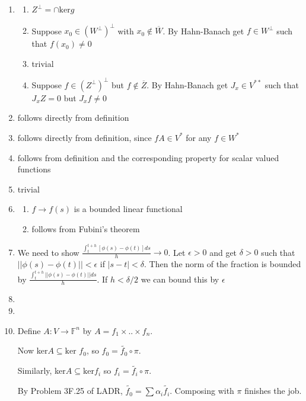 \documentclass{article}
\begin{document}
\begin{enumerate}
\begin{enumerate}
\begin{itemize}
            
            
            
        \end{itemize}
    \end{enumerate}

    \item \begin{enumerate}
        \item $Z^\perp=\cap \text{ker}g$
        \item Suppose $x_0 \in (W^\perp)^\perp$ with $x_0 \notin \overline{W}$. By Hahn-Banach get $f \in W^\perp$ such that $f(x_0) \neq 0$ 
        \item trivial
        \item Suppose $f \in (Z^\perp)^\perp$ but $f \notin \overline{Z}$. By Hahn-Banach get $J_x \in V^{**}$ such that $J_xZ=0$ but $J_xf \neq 0$  
    \end{enumerate}
    
    \item follows directly from definition
    \item follows directly from definition, since $fA \in V^*$ for any $f \in W^*$
    \item follows from definition and the corresponding property for scalar valued functions
    \item trivial
    \item \begin{enumerate}
        \item $f \to f(s)$ is a bounded linear functional
        \item follows from Fubini's theorem
    \end{enumerate}
    \item We need to show $\frac{\int_t^{t+h}[\phi(s)-\phi(t)]ds}{h} \to 0$. Let $\epsilon > 0$ and get $\delta>0$ such that $||\phi(s)-\phi(t)||<\epsilon$ if $|s-t|<\delta$. Then the norm of the fraction is bounded by $\frac{\int_t^{t+h}||\phi(s)-\phi(t)||ds}{h}$. If $h<\delta/2$ we can bound this by $\epsilon$
    \item 
    \item 
    
    
    \item Define $A:V\to \mathbb{F}^n$ by $A=f_1 \times .. \times f_n$. 
    
    Now ker$A \subseteq \text{ker }f_0$, so $f_0=\tilde{f_0} \circ \pi$. 
    
    Similarly, ker$A \subseteq \text{ker}f_i$ so $f_i=\tilde{f_i}\circ \pi$. 
    
    By Problem 3F.25 of LADR, $\tilde{f_0}=\sum\alpha_i\tilde{f_i}$. Composing with $\pi$ finishes the job.
    
\end{enumerate}
\end{document}
